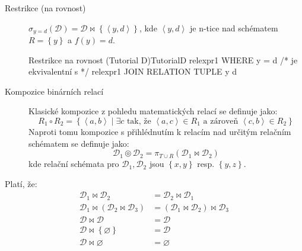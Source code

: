\begin{description}
\item[Restrikce (na rovnost)] $\sigma_{y = d} (\mathcal{D}) = \mathcal{D} \Join \left\{ \left\langle y, d \right\rangle \right\} $, kde $\left\langle y, d \right\rangle$ je n-tice nad schématem $R = \left\{ y \right\}$ a $f(y) = d$.
\begin{upcode}{Restrikce na rovnost (Tutorial D)}{}{TutorialD}
relexpr1 WHERE y = d
/* je ekvivalentní s */
relexpr1 JOIN RELATION {TUPLE {y d}}
\end{upcode}

\item[Kompozice binárních relací] Klasické kompozice z pohledu matematických relací se definuje jako:
$$
R_{1} \circ R_{2} = \left\{ \left\langle a, b \right\rangle \; | \; \exists c \text{ tak, že } \left\langle a, c \right\rangle \in R_{1} \text{ a zároveň } \left\langle c, b \right\rangle \in R_{2} \right\}
$$
Naproti tomu kompozice s přihlédnutím k relacím nad určitým relačním schématem se definuje jako:
$$
\mathcal{D}_{1} \circledcirc \mathcal{D}_{2} = \pi_{T \cup R} (\mathcal{D}_{1} \Join \mathcal{D}_{2})
$$
kde relační schémata pro $\mathcal{D}_{1}, \mathcal{D}_{2}$ jsou $\left\{ x, y \right\}$ resp. $\left\{ y, z \right\}$.

\end{description}
\begin{upquote}
Platí, že:
\begin{align}
\tag{Komutativita}\mathcal{D}_{1} \Join \mathcal{D}_{2} &= \mathcal{D}_{2} \Join \mathcal{D}_{1} \\
\tag{Asociativita}\mathcal{D}_{1} \Join (\mathcal{D}_{2} \Join \mathcal{D}_{3}) &= (\mathcal{D}_{1} \Join \mathcal{D}_{2}) \Join \mathcal{D}_{3} \\
\tag{Idempotence}\mathcal{D} \Join \mathcal{D} &= \mathcal{D} \\
\tag{Neutralita vůči množině obs. $\varnothing$}\mathcal{D} \Join \left\{ \varnothing \right\} &= \mathcal{D} \\
\tag{Anihilace vůči prázdné množině}\mathcal{D} \Join \varnothing &= \varnothing
\end{align}
\end{upquote}
